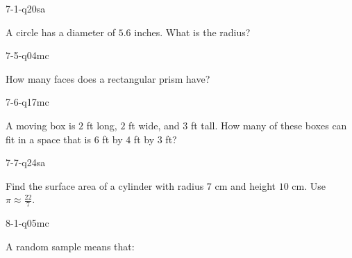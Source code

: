 \begin{practiceQuestion}{7-1-q20}{sa}
\begin{questionText}
A circle has a diameter of $5.6$ inches. What is the radius?
\end{questionText}
\end{practiceQuestion}

\begin{practiceQuestion}{7-5-q04}{mc}
\begin{questionText}
How many faces does a rectangular prism have?
\end{questionText}
\end{practiceQuestion}

\begin{practiceQuestion}{7-6-q17}{mc}
\begin{questionText}
A moving box is $2$ ft long, $2$ ft wide, and $3$ ft tall. How many of these boxes can fit in a space that is $6$ ft by $4$ ft by $3$ ft?
\end{questionText}
\end{practiceQuestion}

\begin{practiceQuestion}{7-7-q24}{sa}
\begin{questionText}
Find the surface area of a cylinder with radius $7$ cm and height $10$ cm. Use $\pi \approx \frac{22}{7}$.
\end{questionText}
\end{practiceQuestion}

\begin{practiceQuestion}{8-1-q05}{mc}
\begin{questionText}
A random sample means that:
\end{questionText}
\end{practiceQuestion}

